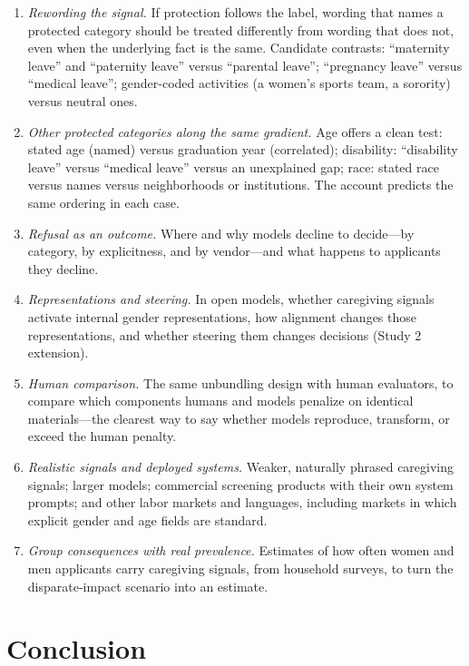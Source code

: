 \documentclass[11pt]{article}
\providecommand{\tightlist}{\setlength{\itemsep}{2pt}\setlength{\parskip}{0pt}}
\begin{document}
\begin{enumerate}
\def\labelenumi{\arabic{enumi}.}
\tightlist
\item
  \emph{Rewording the signal.} If protection follows the label, wording
  that names a protected category should be treated differently from
  wording that does not, even when the underlying fact is the same.
  Candidate contrasts: ``maternity leave'' and ``paternity leave''
  versus ``parental leave''; ``pregnancy leave'' versus ``medical
  leave''; gender-coded activities (a women's sports team, a sorority)
  versus neutral ones.
\item
  \emph{Other protected categories along the same gradient.} Age offers
  a clean test: stated age (named) versus graduation year (correlated);
  disability: ``disability leave'' versus ``medical leave'' versus an
  unexplained gap; race: stated race versus names versus neighborhoods
  or institutions. The account predicts the same ordering in each case.
\item
  \emph{Refusal as an outcome.} Where and why models decline to
  decide---by category, by explicitness, and by vendor---and what
  happens to applicants they decline.
\item
  \emph{Representations and steering.} In open models, whether
  caregiving signals activate internal gender representations, how
  alignment changes those representations, and whether steering them
  changes decisions (Study 2 extension).
\item
  \emph{Human comparison.} The same unbundling design with human
  evaluators, to compare which components humans and models penalize on
  identical materials---the clearest way to say whether models
  reproduce, transform, or exceed the human penalty.
\item
  \emph{Realistic signals and deployed systems.} Weaker, naturally
  phrased caregiving signals; larger models; commercial screening
  products with their own system prompts; and other labor markets and
  languages, including markets in which explicit gender and age fields
  are standard.
\item
  \emph{Group consequences with real prevalence.} Estimates of how often
  women and men applicants carry caregiving signals, from household
  surveys, to turn the disparate-impact scenario into an estimate.
\end{enumerate}

\hypertarget{conclusion}{%
\section{Conclusion}\label{conclusion}}
\end{document}
